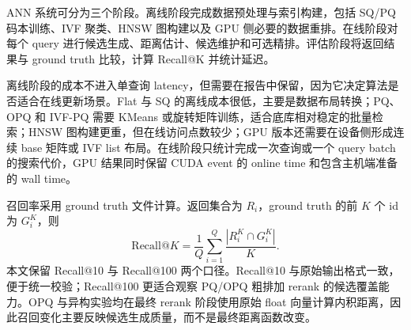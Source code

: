 \documentclass[a4paper,11pt,UTF8]{ctexart}
\begin{document}
ANN 系统可分为三个阶段。离线阶段完成数据预处理与索引构建，包括 SQ/PQ 码本训练、IVF 聚类、HNSW 图构建以及 GPU 侧必要的数据重排。在线阶段对每个 query 进行候选生成、距离估计、候选维护和可选精排。评估阶段将返回结果与 ground truth 比较，计算 Recall@K 并统计延迟。

离线阶段的成本不进入单查询 latency，但需要在报告中保留，因为它决定算法是否适合在线更新场景。Flat 与 SQ 的离线成本很低，主要是数据布局转换；PQ、OPQ 和 IVF-PQ 需要 KMeans 或旋转矩阵训练，适合底库相对稳定的批量检索；HNSW 图构建更重，但在线访问点数较少；GPU 版本还需要在设备侧形成连续 base 矩阵或 IVF list 布局。在线阶段只统计完成一次查询或一个 query batch 的搜索代价，GPU 结果同时保留 CUDA event 的 online time 和包含主机端准备的 wall time。

召回率采用 ground truth 文件计算。返回集合为 $R_i$，ground truth 的前 $K$ 个 id 为 $G_i^K$，则
\[
  \mathrm{Recall@}K=\frac{1}{Q}\sum_{i=1}^{Q}\frac{|R_i^K\cap G_i^K|}{K}.
\]
本文保留 Recall@10 与 Recall@100 两个口径。Recall@10 与原始输出格式一致，便于统一校验；Recall@100 更适合观察 PQ/OPQ 粗排加 rerank 的候选覆盖能力。OPQ 与异构实验均在最终 rerank 阶段使用原始 float 向量计算内积距离，因此召回变化主要反映候选生成质量，而不是最终距离函数改变。
\end{document}
